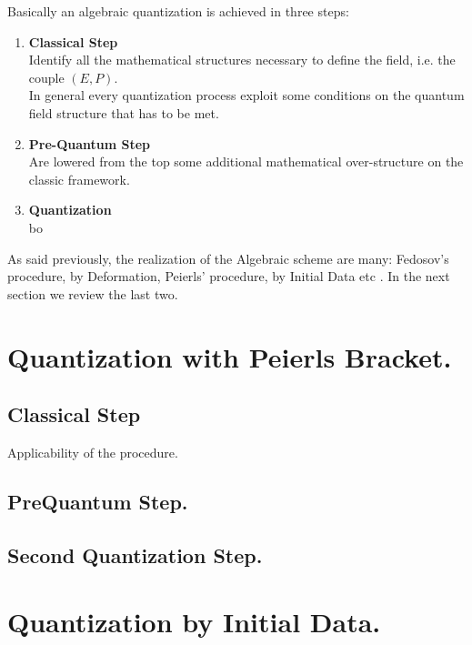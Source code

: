 \documentclass[Main]{subfiles}
\begin{document}
Basically an algebraic quantization is achieved in three steps:
\begin{enumerate}
	\item \textbf{Classical Step}\\
		Identify all the mathematical structures necessary to define the field, i.e. the couple $(E,P)$.\\
		In general every quantization process exploit some conditions on the quantum field structure that has to be met.
	\item \textbf{Pre-Quantum Step}\\
		\danger Are lowered from the top some additional mathematical over-structure  on the classic framework.
		
		
	\item \textbf{Quantization}\\
		bo
\end{enumerate}



As said previously, the realization of the Algebraic scheme are many: Fedosov's procedure, by Deformation, Peierls' procedure, by Initial Data etc .
In the next section we review the last two.

\section{Quantization with Peierls Bracket.}

	\subsection{Classical Step}
	Applicability of the procedure.
	
	\subsection{PreQuantum Step.}
	
	\subsection{Second Quantization Step.}


\section{Quantization by Initial Data.}
\end{document}
